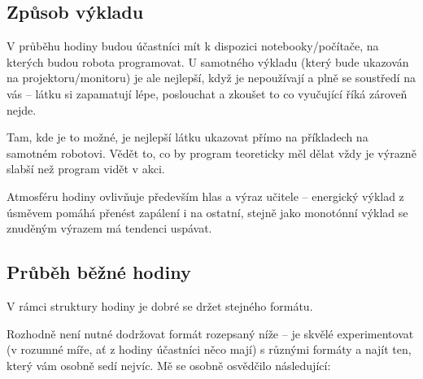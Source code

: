 \subsection{Způsob výkladu}
V průběhu hodiny budou účastníci mít k dispozici notebooky/počítače, na kterých budou robota programovat. U samotného výkladu (který bude ukazován na projektoru/monitoru) je ale nejlepší, když je nepoužívají a plně se soustředí na vás -- látku si zapamatují lépe, poslouchat a zkoušet to co vyučující říká zároveň nejde.

Tam, kde je to možné, je nejlepší látku ukazovat přímo na příkladech na samotném robotovi. Vědět to, co by program teoreticky měl dělat vždy je výrazně slabší než program vidět v akci.

Atmosféru hodiny ovlivňuje především hlas a výraz učitele -- energický výklad z úsměvem pomáhá přenést zapálení i na ostatní, stejně jako monotónní výklad se znuděným výrazem má tendenci uspávat.

\subsection{Průběh běžné hodiny}
V rámci struktury hodiny je dobré se držet stejného formátu.

Rozhodně není nutné dodržovat formát rozepsaný níže -- je skvělé experimentovat (v rozumné míře, ať z hodiny účastníci něco mají) s různými formáty a najít ten, který vám osobně sedí nejvíc. Mě se osobně osvědčilo následující:


